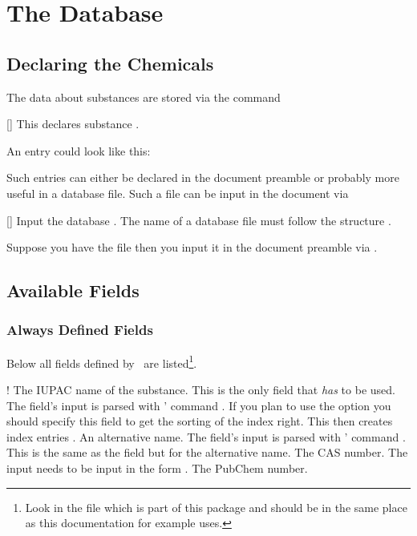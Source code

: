 \documentclass[load-preamble+]{cnltx-doc}
\begin{document}
\section{The Database}
\subsection{Declaring the Chemicals}
The data about substances are stored via the command
\begin{commands}
  []
    This declares substance .
\end{commands}
An entry could look like this:
\begin{sourcecode}
\end{sourcecode}

Such entries can either be declared in the document
preamble or probably more useful in a database file. Such a file can be input
in the document via
\begin{commands}
  []
    Input the database .  The name of a database file must
    follow the structure
    .
\end{commands}
Suppose you have the file  then you
input it in the document preamble via .

\subsection{Available Fields}
\subsubsection{Always Defined Fields}
Below all fields defined by \substances\ are listed\footnote{Look in the file
   which is part of this
  package and should be in the same place as this documentation for example
  uses.}.
\begin{options}
  \Default!
    The \acs{IUPAC} name of the substance. This is the only field that
    \emph{has} to be used. The field's input is parsed with
    ' command .
    If you plan to use the  option you should specify this field
    to get the sorting of the index right. This then creates index entries
    .
    An alternative name. The field's input is parsed with '
    command .
    This is the same as the  field but for the alternative name.
    The \ac{CAS} number. The input needs to be input in the form
    .
    The PubChem number.
\end{options}
\end{document}
